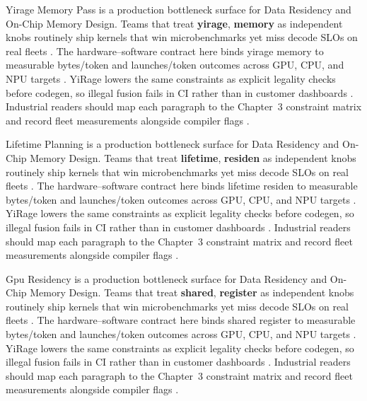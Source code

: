 Yirage Memory Pass is a production bottleneck surface for Data Residency and On-Chip Memory Design. Teams that treat \textbf{yirage}, \textbf{memory} as independent knobs routinely ship kernels that win microbenchmarks yet miss decode SLOs on real fleets \citep{semianalysis2024tma,dlbook}. The hardware--software contract here binds yirage memory to measurable bytes/token and launches/token outcomes across GPU, CPU, and NPU targets \citep{amd2024xdna,dao2022flashattention}. YiRage lowers the same constraints as explicit legality checks before codegen, so illegal fusion fails in CI rather than in customer dashboards \citep{amd2024aie,kwon2023vllm}. Industrial readers should map each paragraph to the Chapter~3 constraint matrix and record fleet measurements alongside compiler flags \citep{dlbook,nvidia2024cudagraphs}.

Lifetime Planning is a production bottleneck surface for Data Residency and On-Chip Memory Design. Teams that treat \textbf{lifetime}, \textbf{residen} as independent knobs routinely ship kernels that win microbenchmarks yet miss decode SLOs on real fleets \citep{amd2024xdna,dao2022flashattention}. The hardware--software contract here binds lifetime residen to measurable bytes/token and launches/token outcomes across GPU, CPU, and NPU targets \citep{amd2024aie,kwon2023vllm}. YiRage lowers the same constraints as explicit legality checks before codegen, so illegal fusion fails in CI rather than in customer dashboards \citep{dlbook,nvidia2024cudagraphs}. Industrial readers should map each paragraph to the Chapter~3 constraint matrix and record fleet measurements alongside compiler flags \citep{dao2022flashattention,liu2024deepseekv3}.

Gpu Residency is a production bottleneck surface for Data Residency and On-Chip Memory Design. Teams that treat \textbf{shared}, \textbf{register} as independent knobs routinely ship kernels that win microbenchmarks yet miss decode SLOs on real fleets \citep{amd2024aie,kwon2023vllm}. The hardware--software contract here binds shared register to measurable bytes/token and launches/token outcomes across GPU, CPU, and NPU targets \citep{dlbook,nvidia2024cudagraphs}. YiRage lowers the same constraints as explicit legality checks before codegen, so illegal fusion fails in CI rather than in customer dashboards \citep{dao2022flashattention,liu2024deepseekv3}. Industrial readers should map each paragraph to the Chapter~3 constraint matrix and record fleet measurements alongside compiler flags \citep{kwon2023vllm,patel2025llminference}.

